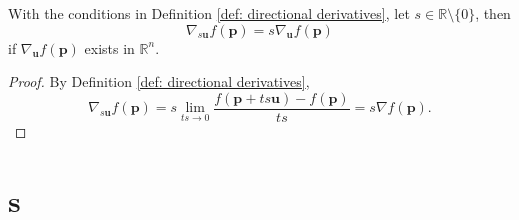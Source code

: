 \begin{lemma}
	With the conditions in Definition \ref{def: directional derivatives}, let $s \in \mathbb R \setminus \{0\}$, then
	$$
	\nabla_{s\mathbf u}f(\mathbf p) = s \nabla_{\mathbf u} f(\mathbf p)
	$$
	if $\nabla_{\mathbf u}f(\mathbf p)$ exists in $\mathbb R^n$.
	
	\begin{proof}	
		By Definition \ref{def: directional derivatives},
		$$
		\nabla_{s\mathbf u} f(\mathbf p) = s\lim_{ts \to 0} \frac{f(\mathbf p + ts\mathbf u) - f(\mathbf p)}{ts} = s \nabla f(\mathbf p).
		$$
	\end{proof}
\end{lemma}




\section{s}















































%